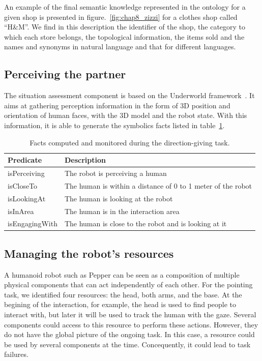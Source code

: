An example of the final semantic knowledge represented in the ontology for a given shop is presented in figure.~\ref{fig:chap8_zizzi} for a clothes shop called ``H\&M''. We find in this description the identifier of the shop, the category to which each store belongs, the topological information, the items sold and the names and synonyms in natural language and that for different languages.

\subsection{Perceiving the partner}

The situation assessment component is based on the Underworld framework~\cite{lemaignan_2018_underworlds}. It aims at gathering perception information in the form of 3D position and orientation of human faces, with the 3D model and the robot state. With this information, it is able to generate the symbolics facts listed in table~\ref{tab:chap8_predicates}.

\begin{table}[ht]
    \centering
    \begin{tabularx}{\textwidth}{|l|X|}
     \hline
    \textbf{Predicate} & \textbf{Description} \\
    \hline
    \hline
        isPerceiving & The robot is perceiving a human \\
        \hline
        isCloseTo & The human is within a distance of 0 to 1 meter of the robot \\
         \hline
        isLookingAt & The human is looking at the robot \\
        \hline
    \hline
        isInArea & The human is in the interaction area \\
        \hline
        isEngagingWith & The human is close to the robot and is looking at it \\
       \hline
    \end{tabularx}
    \caption{Facts computed and monitored during the direction-giving task.}
    \label{tab:chap8_predicates}
\end{table}

\subsection{Managing the robot's resources}

A humanoid robot such as Pepper can be seen as a composition of multiple physical components that can act independently of each other. For the pointing task, we identified four resources: the head, both arms, and the base. At the begining of the interaction, for example, the head is used to find people to interact with, but later it will be used to track the human with the gaze. Several components could access to this resource to perform these actions. However, they do not have the global picture of the ongoing task. In this case, a resource could be used by several components at the time. Concequently, it could lead to task failures.


